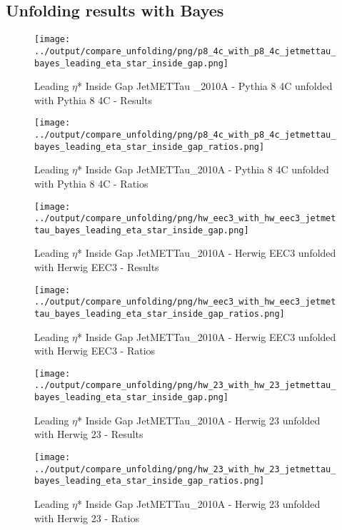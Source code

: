 \documentclass[11pt]{book}
\begin{document}
\subsection{Unfolding results with Bayes}


\begin{figure}[ht]
\centering
\texttt{[image: ../output/compare\_unfolding/png/p8\_4c\_with\_p8\_4c\_jetmettau\_bayes\_leading\_eta\_star\_inside\_gap.png]}
\caption{Leading $\eta$* Inside Gap JetMETTau \_2010A - Pythia 8 4C unfolded with Pythia 8 4C - Results}
\label{p8_p8_jetmettau_bayes_leading_eta_star_inside_gap_a}
\end{figure}

\begin{figure}[ht]
\centering
\texttt{[image: ../output/compare\_unfolding/png/p8\_4c\_with\_p8\_4c\_jetmettau\_bayes\_leading\_eta\_star\_inside\_gap\_ratios.png]}
\caption{Leading $\eta$* Inside Gap JetMETTau\_2010A - Pythia 8 4C unfolded with Pythia 8 4C - Ratios}
\label{p8_p8_jetmettau_bayes_leading_eta_star_inside_gap_b}
\end{figure}

\begin{figure}[ht]
\centering
\texttt{[image: ../output/compare\_unfolding/png/hw\_eec3\_with\_hw\_eec3\_jetmettau\_bayes\_leading\_eta\_star\_inside\_gap.png]}
\caption{Leading $\eta$* Inside Gap JetMETTau\_2010A - Herwig EEC3 unfolded with Herwig EEC3 - Results}
\label{hw_eec3_hw_eec3_jetmettau_bayes_leading_eta_star_inside_gap_a}
\end{figure}

\begin{figure}[ht]
\centering
\texttt{[image: ../output/compare\_unfolding/png/hw\_eec3\_with\_hw\_eec3\_jetmettau\_bayes\_leading\_eta\_star\_inside\_gap\_ratios.png]}
\caption{Leading $\eta$* Inside Gap JetMETTau\_2010A - Herwig EEC3 unfolded with Herwig EEC3 - Ratios}
\label{hw_eec3_hw_eec3_jetmettau_bayes_leading_eta_star_inside_gap_b}
\end{figure}

\begin{figure}[ht]
\centering
\texttt{[image: ../output/compare\_unfolding/png/hw\_23\_with\_hw\_23\_jetmettau\_bayes\_leading\_eta\_star\_inside\_gap.png]}
\caption{Leading $\eta$* Inside Gap JetMETTau\_2010A - Herwig 23 unfolded with Herwig 23 - Results}
\label{hw_23_hw_23_jetmettau_bayes_leading_eta_star_inside_gap_a}
\end{figure}

\begin{figure}[ht]
\centering
\texttt{[image: ../output/compare\_unfolding/png/hw\_23\_with\_hw\_23\_jetmettau\_bayes\_leading\_eta\_star\_inside\_gap\_ratios.png]}
\caption{Leading $\eta$* Inside Gap JetMETTau\_2010A - Herwig 23 unfolded with Herwig 23 - Ratios}
\label{hw_23_hw_23_jetmettau_bayes_leading_eta_star_inside_gap_b}
\end{figure}
\end{document}
